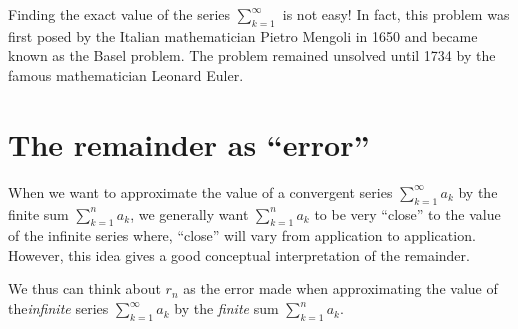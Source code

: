 \documentclass{ximera}
\begin{document}
\begin{remark}
Finding the exact value of the series $\sum_{k=1}^{\infty}$ is not easy!  In fact, this problem was first posed by the Italian mathematician Pietro Mengoli in 1650 and became known as the Basel problem. The problem remained unsolved until 1734 by the famous mathematician Leonard Euler.  
\end{remark}


\section{The remainder as ``error''}

When we want to approximate the value of a convergent series $\sum_{k=1}^{\infty} a_k$ by the finite sum $\sum_{k=1}^{n} a_k$, we generally want $\sum_{k=1}^{n} a_k$ to be very ``close'' to the value of the infinite series where, ``close'' will vary from application to application.  However, this idea gives a good conceptual interpretation of the remainder.

\begin{image}
  \end{image}

We thus can think about $r_n$ as the error made when approximating the value of the\emph{infinite} series $\sum_{k=1}^{\infty} a_k$ by the \emph{finite} sum $\sum_{k=1}^{n} a_k$.
\end{document}
